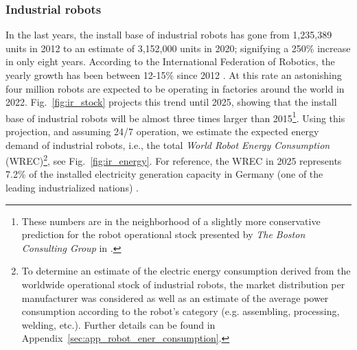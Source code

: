 \subsubsection{Industrial robots}
In the last years, the install base of industrial robots has gone from 1,235,389 units in 2012 to an estimate of 3,152,000 units in 2020; signifying a 250\% increase in only eight years. According to the International Federation of Robotics, the yearly growth has been between 12-15\% since 2012 \cite{IFR2019}. At this rate an astonishing four million robots are expected to be operating in factories around the world in 2022. Fig.~\ref{fig:ir_stock} projects this trend until 2025, showing that the install base of industrial robots will be almost three times larger than 2015\footnote{These numbers are in the neighborhood of a slightly more conservative prediction for the robot operational stock presented by \textit{The Boston Consulting Group} in \cite{sirkin2015}.}. Using this projection, and assuming 24/7 operation, we estimate the expected energy demand of industrial robots, i.e., the total \textit{World Robot Energy Consumption} (WREC)\footnote{To determine an estimate of the electric energy consumption derived from the worldwide operational stock of industrial robots, the market distribution per manufacturer was considered as well as an estimate of the average power consumption according to the robot's category (e.g. assembling, processing, welding, etc.). Further details can be found in Appendix~\ref{sec:app_robot_ener_consumption}.}, see Fig.~\ref{fig:ir_energy}. For reference, the WREC in 2025 represents 7.2\% of the installed electricity generation capacity in Germany (one of the leading industrialized nations) \cite{fraunhofer2016}. 

